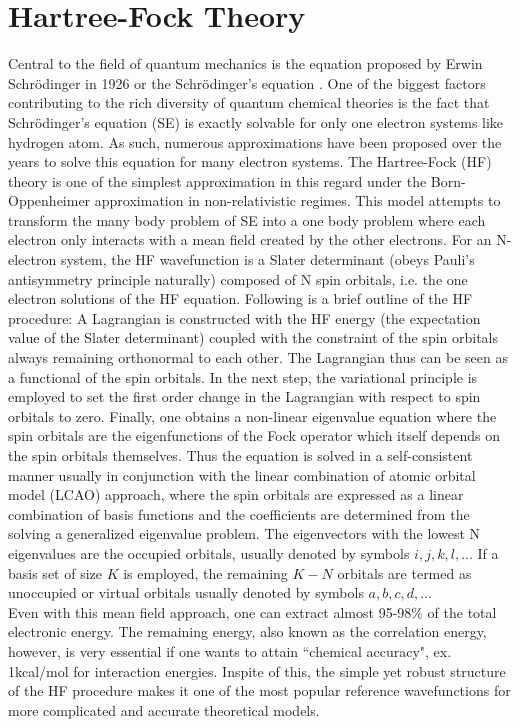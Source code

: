 \section{Hartree-Fock Theory}
Central to the field of quantum mechanics is the equation proposed by Erwin Schr\"odinger 
in 1926 or the Schr\"odinger's equation \cite{Schrodinger26}. One of the biggest factors 
contributing to the rich diversity of quantum chemical theories is the fact that Schr\"odinger's equation (SE)
is exactly solvable for only one electron systems like hydrogen atom. As such, numerous approximations
have been proposed over the years to solve this equation for many electron systems.
The Hartree-Fock (HF) theory\cite{} is one of the simplest approximation in this regard
under the Born-Oppenheimer approximation\cite{} in non-relativistic regimes\cite{}. This
model attempts to transform the many body problem of SE into a one body problem where each electron
only interacts with a mean field created by the other electrons. For an N-electron system, the HF 
wavefunction is a Slater determinant (obeys Pauli's antisymmetry principle naturally) composed of N 
spin orbitals, i.e. the one electron solutions of the HF equation. Following is a brief outline
of the HF procedure: A Lagrangian is constructed with the HF energy (the expectation value of the 
Slater determinant) coupled with the constraint of the spin orbitals always remaining 
orthonormal to each other. The Lagrangian thus can be seen as a functional of the spin 
orbitals. In the next step, the variational principle is employed to set the first order 
change in the Lagrangian with respect to spin orbitals to zero. Finally, one obtains 
a non-linear eigenvalue equation where the spin orbitals are the eigenfunctions of 
the Fock operator which itself depends on the spin orbitals themselves. 
Thus the equation is solved in a self-consistent manner usually in conjunction with 
the linear combination of atomic orbital model (LCAO) approach, where the spin 
orbitals are expressed as a linear combination of basis functions and the 
coefficients are determined from the solving a generalized eigenvalue problem.
The eigenvectors with the lowest N eigenvalues are the occupied orbitals, usually 
denoted by symbols $i,j,k,l,..$. If a basis set of size $K$ is employed, the remaining $K-N$
orbitals are termed as unoccupied or virtual orbitals usually denoted by symbols $a,b,c,d,..$.
\\
Even with this mean field approach, one can extract almost 95-98\% of the total 
electronic energy. The remaining energy, also known as the correlation energy,
however, is very essential if one wants to attain ``chemical accuracy", ex.  
1kcal/mol for interaction energies. Inspite of this, the simple yet robust 
structure of the HF procedure makes it one of the most popular reference 
wavefunctions for more complicated and accurate theoretical models.
